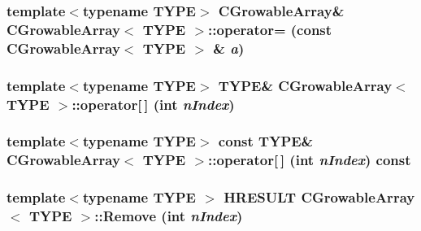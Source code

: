 \label{class_c_growable_array_aaff681306d8ac4a490d7bca720f2a51a}
\hypertarget{class_c_growable_array_add2653ca7201a0500ba21d4783990552}{
\subsubsection[{operator=}]{\setlength{\rightskip}{0pt plus 5cm}template$<$typename TYPE$>$ {\bf CGrowableArray}\& {\bf CGrowableArray}$<$ TYPE $>$::operator= (const {\bf CGrowableArray}$<$ TYPE $>$ \& {\em a})}}
\label{class_c_growable_array_add2653ca7201a0500ba21d4783990552}
\hypertarget{class_c_growable_array_a03c07cc22ff5856f83633a58f37e64b9}{
\subsubsection[{operator[]}]{\setlength{\rightskip}{0pt plus 5cm}template$<$typename TYPE$>$ TYPE\& {\bf CGrowableArray}$<$ TYPE $>$::operator\mbox{[}$\,$\mbox{]} ({\bf int} {\em nIndex})}}
\label{class_c_growable_array_a03c07cc22ff5856f83633a58f37e64b9}
\hypertarget{class_c_growable_array_a8250879c57e65000a7ac62644432e292}{
\subsubsection[{operator[]}]{\setlength{\rightskip}{0pt plus 5cm}template$<$typename TYPE$>$ const TYPE\& {\bf CGrowableArray}$<$ TYPE $>$::operator\mbox{[}$\,$\mbox{]} ({\bf int} {\em nIndex}) const}}
\label{class_c_growable_array_a8250879c57e65000a7ac62644432e292}
\hypertarget{class_c_growable_array_ad8d75650829296f666f9c1f099f505a4}{
\subsubsection[{Remove}]{\setlength{\rightskip}{0pt plus 5cm}template$<$typename TYPE $>$ HRESULT {\bf CGrowableArray}$<$ TYPE $>$::Remove ({\bf int} {\em nIndex})}}
